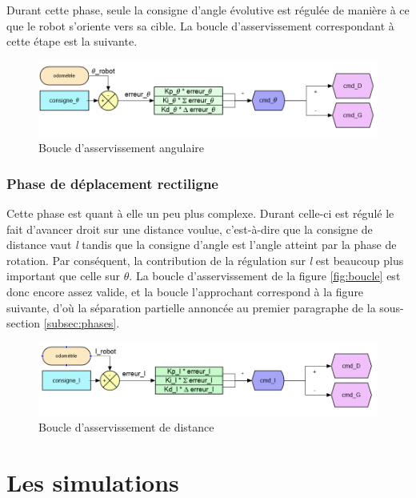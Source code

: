\documentclass[a4paper,11pt]{article}
\begin{document}
Durant cette phase, seule la consigne d'angle évolutive est régulée de manière à ce que le robot s'oriente vers sa cible. La boucle d'asservissement correspondant à cette étape est la suivante.

\begin{figure}[H]
    \centering
    \includegraphics[scale = 0.8]{Captureboucletheta.PNG}
    \caption{Boucle d'asservissement angulaire}
    \label{fig:boucletheta}
\end{figure}

\subsubsection{Phase de déplacement rectiligne}

Cette phase est quant à elle un peu plus complexe. Durant celle-ci est régulé le fait d'avancer droit sur une distance voulue, c'est-à-dire que la consigne de distance vaut \textit{l} tandis que la consigne d'angle est l'angle atteint par la phase de rotation. Par conséquent, la contribution de la régulation sur \textit{l} est beaucoup plus important que celle sur \textit{$\theta$}. La boucle d'asservissement de la figure \ref{fig:boucle} est donc encore assez valide, et la boucle l'approchant correspond à la figure suivante, d'où la séparation partielle annoncée au premier paragraphe de la sous-section \ref{subsec:phases}.

\begin{figure}[H]
    \centering
    \includegraphics[scale = 0.8]{Capturebouclel.PNG}
    \caption{Boucle d'asservissement de distance}
    \label{fig:bouclel}
\end{figure}
\clearpage

\section{Les simulations}
\end{document}
